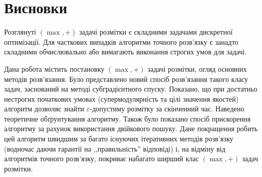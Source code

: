 \chapter*{Висновки}

Розглянуті $(\max,+)$ задачі розмітки є складними задачами дискретної оптимізації.
Для часткових випадків алгоритми точного розв'язку є занадто складними
обчислювально або вимагають виконання строгих умов для задачі.

Дана робота містить постановку $(\max,+)$
задачі розмітки, огляд основних методів розв'язання. Було представлено
новий спосіб розв'язання такого класу задач, заснований на методі субградієнтного спуску.
Показано, що при достатньо нестрогих початкових умовах (супермодулярність та цілі значення якостей)
алгоритм дозволяє знайти $\varepsilon$-допустиму розмітку за скінченний час. Наведено теоретичне
обґрунтування алгоритму. Також було показано спосіб прискорення алгоритму за рахунок 
використання двійкового пошуку. Дане покращення робить цей алгоритм швидшим за багато
існуючих ітеративних методів розв’язку (водночас даючи гарантії на ,,правильність'' відповіді)
і, на відміну від алгоритмів точного розв'язку, покриває набагато ширший клас $(\max,+)$ задач розмітки.